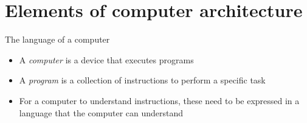 

\section*{Elements of computer architecture}

\begin{frame}{The language of a computer}
  \begin{itemize}[<+->]
  \item A \textit{computer} is a device that executes programs
  \item A \textit{program} is a collection of instructions to perform a specific
    task
  \item For a computer to understand instructions, these need to be expressed in a
    language that the computer can understand
  \end{itemize}

\end{frame}

